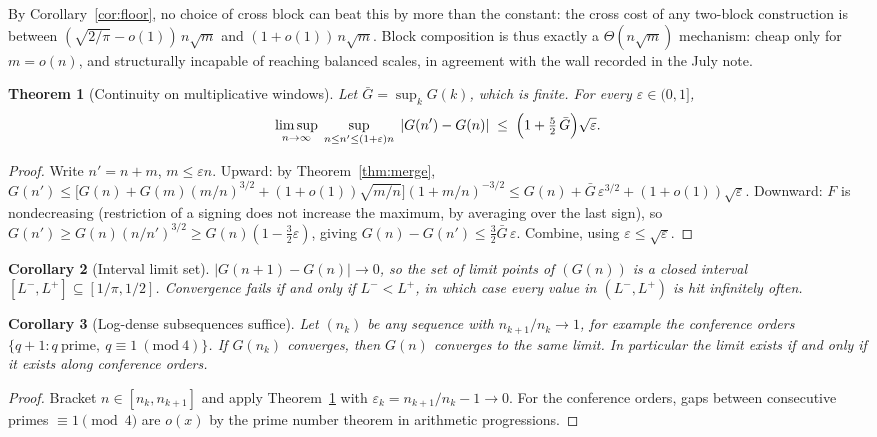 \documentclass[11pt]{article}
\newtheorem{theorem}{Theorem}[section]
\newtheorem{corollary}[theorem]{Corollary}
\theoremstyle{remark}
\begin{document}
By Corollary~\ref{cor:floor}, no choice of cross block can beat this
by more than the constant: the cross cost of any two-block
construction is between $(\sqrt{2/\pi}-o(1))\,n\sqrt m$ and
$(1+o(1))\,n\sqrt m$. Block composition is thus exactly a
$\Theta(n\sqrt m)$ mechanism: cheap only for $m=o(n)$, and structurally
incapable of reaching balanced scales, in agreement with the wall
recorded in the July note.

\begin{theorem}[Continuity on multiplicative windows]\label{thm:cont}
Let $\bar G=\sup_kG(k)$, which is finite. For every
$\varepsilon\in(0,1]$,
\[
 \limsup_{n\to\infty}\;
 \sup_{n\le n'\le(1+\varepsilon)n}\;|G(n')-G(n)|
 \;\le\;\Bigl(1+\tfrac52\,\bar G\Bigr)\sqrt\varepsilon .
\]
\end{theorem}
\begin{proof}
Write $n'=n+m$, $m\le\varepsilon n$. Upward:
by Theorem~\ref{thm:merge},
$G(n')\le\bigl[G(n)+G(m)(m/n)^{3/2}+(1+o(1))\sqrt{m/n}\bigr]
(1+m/n)^{-3/2}
\le G(n)+\bar G\,\varepsilon^{3/2}+(1+o(1))\sqrt\varepsilon$.
Downward: $F$ is nondecreasing (restriction of a signing does not
increase the maximum, by averaging over the last sign), so
$G(n')\ge G(n)(n/n')^{3/2}\ge G(n)(1-\tfrac32\varepsilon)$, giving
$G(n)-G(n')\le\tfrac32\bar G\,\varepsilon$. Combine, using
$\varepsilon\le\sqrt\varepsilon$.
\end{proof}

\begin{corollary}[Interval limit set]\label{cor:interval}
$|G(n+1)-G(n)|\to0$, so the set of limit points of $(G(n))$ is a
closed interval $[L^-,L^+]\subseteq[1/\pi,1/2]$. Convergence fails if
and only if $L^-<L^+$, in which case every value in $(L^-,L^+)$ is hit
infinitely often.
\end{corollary}

\begin{corollary}[Log-dense subsequences suffice]\label{cor:subseq}
Let $(n_k)$ be any sequence with $n_{k+1}/n_k\to1$, for example the
conference orders $\{q+1:q\ \text{prime},\ q\equiv1\ (\mathrm{mod}\ 4)\}$.
If $G(n_k)$ converges, then $G(n)$ converges to the same limit.
In particular the limit exists if and only if it exists along
conference orders.
\end{corollary}
\begin{proof}
Bracket $n\in[n_k,n_{k+1}]$ and apply Theorem~\ref{thm:cont} with
$\varepsilon_k=n_{k+1}/n_k-1\to0$. For the conference orders, gaps
between consecutive primes $\equiv1\pmod4$ are $o(x)$ by the prime
number theorem in arithmetic progressions.
\end{proof}
\end{document}
